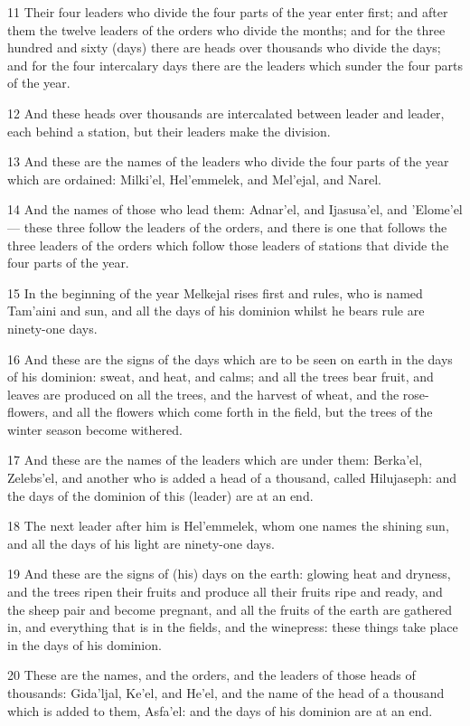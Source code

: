 \par 11 Their four leaders who divide the four parts of the year enter first; and after them the twelve leaders of the orders who divide the months; and for the three hundred and sixty (days) there are heads over thousands who divide the days; and for the four intercalary days there are the leaders which sunder the four parts of the year.
\par 12 And these heads over thousands are intercalated between leader and leader, each behind a station, but their leaders make the division.
\par 13 And these are the names of the leaders who divide the four parts of the year which are ordained: Milki’el, Hel’emmelek, and Mel’ejal, and Narel.
\par 14 And the names of those who lead them: Adnar’el, and Ijasusa’el, and ’Elome’el— these three follow the leaders of the orders, and there is one that follows the three leaders of the orders which follow those leaders of stations that divide the four parts of the year.
\par 15 In the beginning of the year Melkejal rises first and rules, who is named Tam’aini and sun, and all the days of his dominion whilst he bears rule are ninety-one days.
\par 16 And these are the signs of the days which are to be seen on earth in the days of his dominion: sweat, and heat, and calms; and all the trees bear fruit, and leaves are produced on all the trees, and the harvest of wheat, and the rose-flowers, and all the flowers which come forth in the field, but the trees of the winter season become withered.
\par 17 And these are the names of the leaders which are under them: Berka’el, Zelebs’el, and another who is added a head of a thousand, called Hilujaseph: and the days of the dominion of this (leader) are at an end.
\par 18 The next leader after him is Hel’emmelek, whom one names the shining sun, and all the days of his light are ninety-one days.
\par 19 And these are the signs of (his) days on the earth: glowing heat and dryness, and the trees ripen their fruits and produce all their fruits ripe and ready, and the sheep pair and become pregnant, and all the fruits of the earth are gathered in, and everything that is in the fields, and the winepress: these things take place in the days of his dominion.
\par 20 These are the names, and the orders, and the leaders of those heads of thousands: Gida’ljal, Ke’el, and He’el, and the name of the head of a thousand which is added to them, Asfa’el: and the days of his dominion are at an end.

